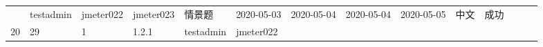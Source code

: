 \documentclass[hyperref, a4paper]{ctexart}
\begin{document}
\begin{longtable}[]{@{}llllllllllllll@{}}
\begin{minipage}[t]{0.07\columnwidth}
\end{minipage} & \begin{minipage}[t]{0.04\columnwidth}\raggedright
testadmin\strut
\end{minipage} & \begin{minipage}[t]{0.04\columnwidth}\raggedright
jmeter022\strut
\end{minipage} & \begin{minipage}[t]{0.04\columnwidth}\raggedright
jmeter023\strut
\end{minipage} & \begin{minipage}[t]{0.03\columnwidth}\raggedright
情景题\strut
\end{minipage} & \begin{minipage}[t]{0.05\columnwidth}\raggedright
2020-05-03\strut
\end{minipage} & \begin{minipage}[t]{0.05\columnwidth}\raggedright
2020-05-04\strut
\end{minipage} & \begin{minipage}[t]{0.08\columnwidth}\raggedright
2020-05-04\strut
\end{minipage} & \begin{minipage}[t]{0.08\columnwidth}\raggedright
2020-05-05\strut
\end{minipage} & \begin{minipage}[t]{0.04\columnwidth}\raggedright
中文\strut
\end{minipage} & \begin{minipage}[t]{0.02\columnwidth}\raggedright
成功\strut
\end{minipage}\tabularnewline
\begin{minipage}[t]{0.02\columnwidth}\raggedright
20\strut
\end{minipage} & \begin{minipage}[t]{0.05\columnwidth}\raggedright
29\strut
\end{minipage} & \begin{minipage}[t]{0.03\columnwidth}\raggedright
1\strut
\end{minipage} & \begin{minipage}[t]{0.07\columnwidth}\raggedright
1.2.1\strut
\end{minipage} & \begin{minipage}[t]{0.04\columnwidth}\raggedright
testadmin\strut
\end{minipage} & \begin{minipage}[t]{0.04\columnwidth}\raggedright
jmeter022\strut
\end{minipage} & \begin{minipage}[t]{0.04\columnwidth}\raggedright

\end{minipage}
\end{longtable}
\end{document}
